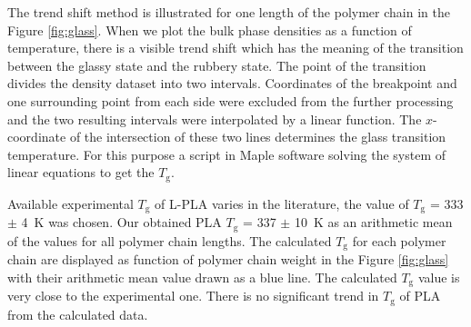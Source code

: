 The trend shift method is illustrated for one length of the polymer chain in the Figure \ref{fig:glass}. When we plot the bulk phase densities as a function of temperature, there is a visible trend shift which has the meaning of the transition between the glassy state and the rubbery state. The point of the transition divides the density dataset into two intervals. Coordinates of the breakpoint and one surrounding point from each side were excluded from the further processing and the two resulting intervals were interpolated by a linear function. The $x$-coordinate of the intersection of these two lines determines the glass transition temperature. For this purpose a script in Maple software solving the system of linear equations to get the $T_\mathrm{g}$.

Available experimental $T_\mathrm{g}$ of L-PLA varies in the literature, the value  of $T_\mathrm{g}$ = 333 $\pm$ 4~K \cite{pyda_reversing_2005} was chosen. Our obtained PLA $T_\mathrm{g}$ = 337 $\pm$ 10~K as an arithmetic mean of the values for all polymer chain lengths. The calculated $T_\mathrm{g}$ for each polymer chain are displayed as function of polymer chain weight in the Figure \ref{fig:glass} with their arithmetic mean value drawn as a blue line. The calculated $T_\mathrm{g}$ value is very close to the experimental one. There is no significant trend in $T_\mathrm{g}$ of PLA from the calculated data. 


